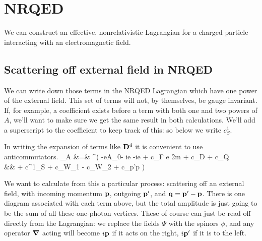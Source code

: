 \section{NRQED}

We can construct an effective, nonrelativistic Lagrangian for a charged particle interacting with an electromagnetic field.


\subsection{Scattering off external field in NRQED}
We can write down those terms in the NRQED Lagrangian which have one power of the external field.  This set of terms will not, by themselves, be gauge invariant. If, for example, a coefficient exists before a term with both one and two powers of $A$, we'll want to make sure we get the same result in both calculations.  We'll add a superscript to the coefficient to keep track of this: so below we write $c^1_S$.

In writing the expansion of terms like $\mathbf{D}^4$ it is convenient to use anticommutators.
\small
\beqa
{}_A &=& \Psi^\dagger (  -eA_0- ie   -ie  
		+ c_F e  {2m}   	
		+ c_D 	
		+ c_Q 	
	\\&&	+ c^{1}_S 
		+ c_{W_1} 	
		- c_{W_2} 
		+ c_{p'p} \frac{ e [ (\v{S} \smalldot \v{\grad}) (\v{B} \smalldot \v{\grad}) + (\v{B} \smalldot \v{\grad})(\v{S} \smalldot \v{\grad}) }{8m^3} \big )\Psi
\eeqa
\normalsize


We want to calculate from this a particular process: scattering off an external field, with incoming momentum $\mathbf{p}$, outgoing $\mathbf{p'}$, and $\mathbf{q} = \mathbf{p'} - \mathbf{p}$.  There is one diagram associated with each term above, but the total amplitude is just going to be the sum of all these one-photon vertices.  These of course can just be read off directly from the Lagrangian: we replace the fields $\Psi$ with the spinors $\phi$, and any operator $\grad$ acting will become $i\mathbf{p}$ if it acts on the right, $i\mathbf{p'}$ if it is to the left.

